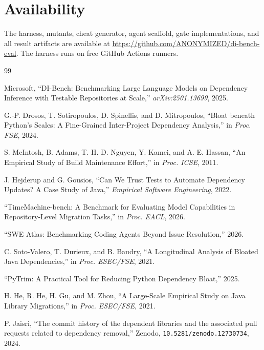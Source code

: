 \documentclass[10pt,conference]{IEEEtran}
\begin{document}
\section*{Availability}

The harness, mutants, cheat generator, agent scaffold, gate
implementations, and all result artifacts are available at
\url{https://github.com/ANONYMIZED/di-bench-eval}. The harness runs on
free GitHub Actions runners.

\balance
\begin{thebibliography}{99}
\footnotesize

Microsoft, ``DI-Bench: Benchmarking Large Language Models on Dependency
Inference with Testable Repositories at Scale,'' \emph{arXiv:2501.13699},
2025.

G.-P. Drosos, T. Sotiropoulos, D. Spinellis, and D. Mitropoulos,
``Bloat beneath Python's Scales: A Fine-Grained Inter-Project Dependency
Analysis,'' in \emph{Proc. FSE}, 2024.

S. McIntosh, B. Adams, T. H. D. Nguyen, Y. Kamei, and A. E. Hassan,
``An Empirical Study of Build Maintenance Effort,'' in \emph{Proc. ICSE},
2011.

J. Hejderup and G. Gousios, ``Can We Trust Tests to Automate Dependency
Updates? A Case Study of Java,'' \emph{Empirical Software Engineering},
2022.

``TimeMachine-bench: A Benchmark for Evaluating Model Capabilities in
Repository-Level Migration Tasks,'' in \emph{Proc. EACL}, 2026.

``SWE Atlas: Benchmarking Coding Agents Beyond Issue Resolution,'' 2026.

C. Soto-Valero, T. Durieux, and B. Baudry, ``A Longitudinal Analysis of
Bloated Java Dependencies,'' in \emph{Proc. ESEC/FSE}, 2021.

``PyTrim: A Practical Tool for Reducing Python Dependency Bloat,'' 2025.

H. He, R. He, H. Gu, and M. Zhou, ``A Large-Scale Empirical Study on Java
Library Migrations,'' in \emph{Proc. ESEC/FSE}, 2021.

P. Jaisri, ``The commit history of the dependent libraries and the
associated pull requests related to dependency removal,'' Zenodo,
\texttt{10.5281/zenodo.12730734}, 2024.


\end{thebibliography}
\end{document}
